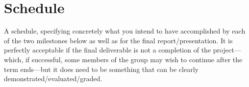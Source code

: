 \section{Schedule}

A schedule, specifying concretely what you intend to have accomplished by each
of the two milestones below as well as for the final report/presentation. It is
perfectly acceptable if the final deliverable is not a completion of the
project---which, if successful, some members of the group may wish to continue
after the term ends---but it does need to be something that can be clearly
demonstrated/evaluated/graded.
